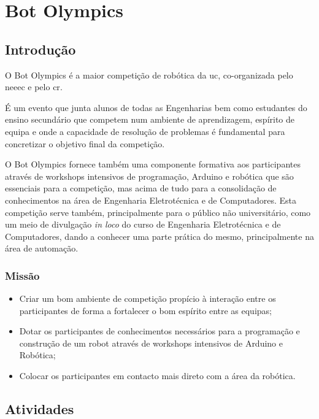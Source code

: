 
\section{Bot Olympics}

\subsection{Introdução}

O Bot Olympics é a maior competição de robótica da \acrlong{uc}, co-organizada pelo \acrshort{neeec} e pelo \acrfull{cr}.

É um evento que junta alunos de todas as Engenharias bem como estudantes do ensino secundário que competem num ambiente de aprendizagem, espírito de equipa e onde a capacidade de resolução de problemas é fundamental para concretizar o objetivo final da competição.

O Bot Olympics fornece também uma componente formativa aos participantes através de workshops intensivos de programação, Arduino e robótica que são essenciais para a competição, mas acima de tudo para a consolidação de conhecimentos na área de Engenharia Eletrotécnica e de Computadores.
Esta competição serve também, principalmente para o público não universitário, como um meio de divulgação \textit{in loco} do curso de Engenharia Eletrotécnica e de Computadores, dando a conhecer uma parte prática do mesmo, principalmente na área de automação.

\subsubsection{Missão}

\begin{itemize}
\item Criar um bom ambiente de competição propício à interação entre os participantes de forma a fortalecer o bom espírito entre as equipas;
\item Dotar os participantes de conhecimentos necessários para a programação e construção de um robot através de workshops intensivos de Arduino e Robótica;
\item Colocar os participantes em contacto mais direto com a área da robótica.
\end{itemize}

\subsection{Atividades}

